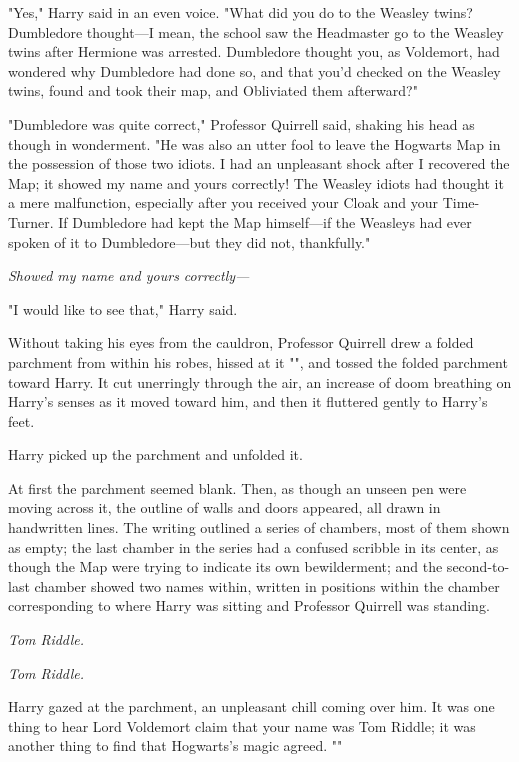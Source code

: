 "Yes," Harry said in an even voice. "What did you do to the Weasley twins? 
Dumbledore thought---I mean, the school saw the Headmaster go to the Weasley 
twins after Hermione was arrested. Dumbledore thought you, as Voldemort, had 
wondered why Dumbledore had done so, and that you'd checked on the Weasley 
twins, found and took their map, and Obliviated them afterward?"

"Dumbledore was quite correct," Professor Quirrell said, shaking his head as 
though in wonderment. "He was also an utter fool to leave the Hogwarts Map in 
the possession of those two idiots. I had an unpleasant shock after I recovered 
the Map; it showed my name and yours correctly! The Weasley idiots had thought 
it a mere malfunction, especially after you received your Cloak and your 
Time-Turner. If Dumbledore had kept the Map himself---if the Weasleys had ever 
spoken of it to Dumbledore---but they did not, thankfully."

\emph{Showed my name and yours correctly---}

"I would like to see that," Harry said.

Without taking his eyes from the cauldron, Professor Quirrell drew a folded 
parchment from within his robes, hissed at it "", and tossed the folded parchment toward Harry. It cut 
unerringly through the air, an increase of doom breathing on Harry's senses as 
it moved toward him, and then it fluttered gently to Harry's feet.

Harry picked up the parchment and unfolded it.

At first the parchment seemed blank. Then, as though an unseen pen were moving 
across it, the outline of walls and doors appeared, all drawn in handwritten 
lines. The writing outlined a series of chambers, most of them shown as empty; 
the last chamber in the series had a confused scribble in its center, as though 
the Map were trying to indicate its own bewilderment; and the second-to-last 
chamber showed two names within, written in positions within the chamber 
corresponding to where Harry was sitting and Professor Quirrell was standing.

\emph{Tom Riddle.}

\emph{Tom Riddle.}

Harry gazed at the parchment, an unpleasant chill coming over him. It was one 
thing to hear Lord Voldemort claim that your name was Tom Riddle; it was 
another thing to find that Hogwarts's magic agreed. ""

